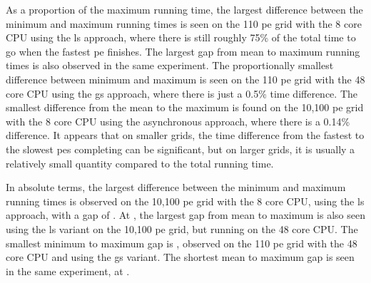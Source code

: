 As a proportion of the maximum running time, the largest difference between the minimum and maximum running times is seen on the 110 \gls{pe} grid with the 8 core CPU using the \gls{ls} approach, where there is still roughly 75\% of the total time to go when the fastest \gls{pe} finishes.  The largest gap from mean to maximum running times is also observed in the same experiment.  The proportionally smallest difference between minimum and maximum is seen on the 110 \gls{pe} grid with the 48 core CPU using the \gls{gs} approach, where there is just a 0.5\% time difference.  The smallest difference from the mean to the maximum is found on the 10,100 \gls{pe} grid with the 8 core CPU using the asynchronous approach, where there is a 0.14\% difference.  It appears that on smaller grids, the time difference from the fastest to the slowest \glspl{pe} completing can be significant, but on larger grids, it is usually a relatively small quantity compared to the total running time.

In absolute terms, the largest difference between the minimum and maximum running times is observed on the 10,100 \gls{pe} grid with the 8 core CPU, using the \gls{ls} approach, with a gap of .  At , the largest gap from mean to maximum is also seen using the \gls{ls} variant on the 10,100 \gls{pe} grid, but running on the 48 core CPU.  The smallest minimum to maximum gap is , observed on the 110 \gls{pe} grid with the 48 core CPU and using the \gls{gs} variant.  The shortest mean to maximum gap is seen in the same experiment, at .

